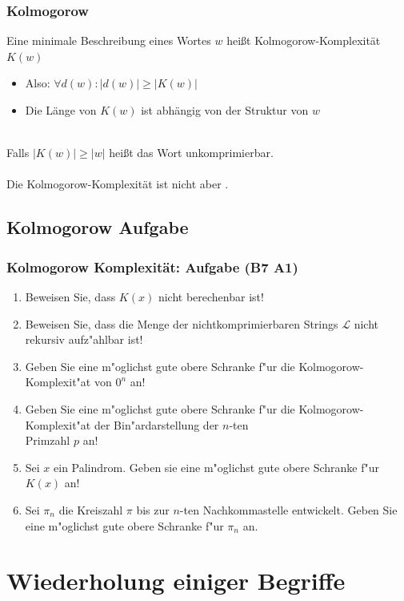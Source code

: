 \begin{frame}
	\frametitle{Kolmogorow}
	Eine minimale Beschreibung eines Wortes $w$ heißt Kolmogorow-Komplexität $K(w)$
	\begin{itemize}
		\item Also: $\forall d(w): |d(w)| \geq |K(w)|$
		\item Die Länge von $K(w)$ ist abhängig von der Struktur von $w$
	\end{itemize}~\\
	Falls $|K(w)| \geq |w|$ heißt das Wort unkomprimierbar.~\\~\\
	Die Kolmogorow-Komplexität ist nicht  aber \only<2>{rekursiv aufzählbar}.

\end{frame}

\subsection{Kolmogorow Aufgabe}
\begin{frame}
	\frametitle{Kolmogorow Komplexität: Aufgabe (B7 A1)}
	\begin{enumerate}
		\item Beweisen Sie, dass $K(x)$ nicht berechenbar ist!
		\item Beweisen Sie, dass die Menge der nichtkomprimierbaren Strings $\mathcal{L}$
		nicht rekursiv aufz"ahlbar ist!
		\item Geben Sie eine m"oglichst gute obere Schranke f"ur die Kolmogorow-Komplexit"at von $0^n$ an!
		\item Geben Sie eine m"oglichst gute obere Schranke f"ur die Kolmogorow-Komplexit"at der
		Bin"ardarstellung der $n$-ten\\ Primzahl $p$ an!
		\item Sei $x$ ein Palindrom. Geben sie eine m"oglichst gute obere Schranke f"ur $K(x)$ an!
		\item Sei $\pi_n$ die Kreiszahl $\pi$ bis zur $n$-ten Nachkommastelle entwickelt. Geben Sie eine m"oglichst gute obere Schranke f"ur $\pi_n$ an.
	\end{enumerate}
\end{frame}

\section{Wiederholung einiger Begriffe}
